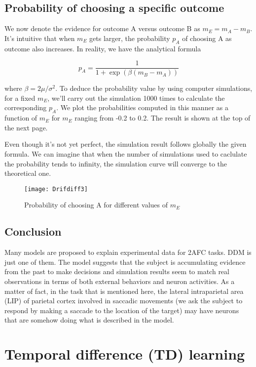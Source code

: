 \subsection{Probability of choosing a specific outcome}

We now denote the evidence for outcome A versus outcome B as $m_E = m_A - m_B$.
It's intuitive that when $m_E$ gets larger, the probability $p_A$ of choosing 
A as outcome also increases. In reality, we have the analytical formula

\[p_A = \frac{1}{1 + \exp(\beta(m_B - m_A))}\]

\noindent
where $\beta = 2\mu/\sigma^2$. To deduce the probability value by using
computer simulations, for a fixed $m_E$, we'll carry out the simulation 1000 
times to calculate the corresponding $p_A$. We plot the probabilities computed
in this manner as a function of $m_E$ for $m_E$ ranging from -0.2 to 0.2. The
result is shown at the top of the next page.

Even though it's not yet perfect, the simulation result follows globally the
given formula. We can imagine that when the number of simulations used to
caclulate the probability tends to infinity, the simulation curve will 
converge to the theoretical one.

\vspace*{-1em}
\begin{figure}[H]
  \centering
  \texttt{[image: Drifdiff3]}
  \caption {Probability of choosing A for different values of $m_E$}
\end{figure}

\subsection{Conclusion}

Many models are proposed to explain experimental data for 2AFC tasks. DDM is
just one of them. The model suggests that the subject is accumulating evidence
from the past to make decisions and simulation results seem to match real
observations in terms of both external behaviors and neuron activities. As a
matter of fact, in the task that is mentioned here, the lateral intraparietal
area (LIP) of parietal cortex involved in saccadic movements (we ask the
subject to respond by making a saccade to the location of the target) may have
neurons that are somehow doing what is described in the model. 


\section{Temporal difference (TD) learning}

